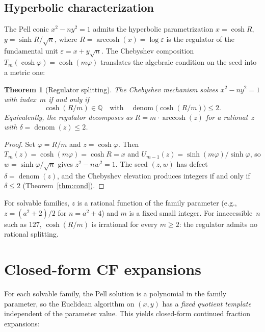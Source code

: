 \documentclass[11pt]{article}
\newtheorem{theorem}{Theorem}
\theoremstyle{definition}
\theoremstyle{remark}
\begin{document}
\subsection{Hyperbolic characterization}

The Pell conic $x^2 - ny^2 = 1$ admits the hyperbolic parametrization
$x = \cosh R$, $y = \sinh R / \sqrt{n}$, where
$R = \operatorname{arccosh}(x) = \log\varepsilon$ is the regulator
of the fundamental unit $\varepsilon = x + y\sqrt{n}$.
The Chebyshev composition $T_m(\cosh\varphi) = \cosh(m\varphi)$
translates the algebraic condition on the seed into a metric one:

\begin{theorem}[Regulator splitting]\label{thm:split}
The Chebyshev mechanism solves $x^2 - ny^2 = 1$ with index~$m$
if and only if
\begin{equation}\label{eq:split}
\cosh(R/m) \in \mathbb{Q}
\quad\text{with}\quad
\operatorname{denom}\bigl(\cosh(R/m)\bigr) \le 2.
\end{equation}
Equivalently, the regulator decomposes as
$R = m \cdot \operatorname{arccosh}(z)$ for a rational~$z$
with $\delta = \operatorname{denom}(z) \le 2$.
\end{theorem}

\begin{proof}
Set $\varphi = R/m$ and $z = \cosh\varphi$.  Then
$T_m(z) = \cosh(m\varphi) = \cosh R = x$ and
$U_{m-1}(z) = \sinh(m\varphi)/\sinh\varphi$, so
$w = \sinh\varphi / \sqrt{n}$ gives $z^2 - nw^2 = 1$.
The seed $(z, w)$ has defect $\delta = \operatorname{denom}(z)$,
and the Chebyshev elevation produces integers if and only if
$\delta \le 2$ (Theorem~\ref{thm:cond}).
\end{proof}

For solvable families, $z$ is a rational function of the family
parameter (e.g., $z = (a^2+2)/2$ for $n = a^2+4$) and $m$ is a
fixed small integer.
For inaccessible~$n$ such as $127$, $\cosh(R/m)$ is irrational
for every $m \ge 2$: the regulator admits no rational splitting.

\section{Closed-form CF expansions}\label{sec:cf}

For each solvable family, the Pell solution is a polynomial in the
family parameter, so the Euclidean algorithm on $(x, y)$ has a
\emph{fixed quotient template} independent of the parameter value.
This yields closed-form continued fraction expansions:
\end{document}
